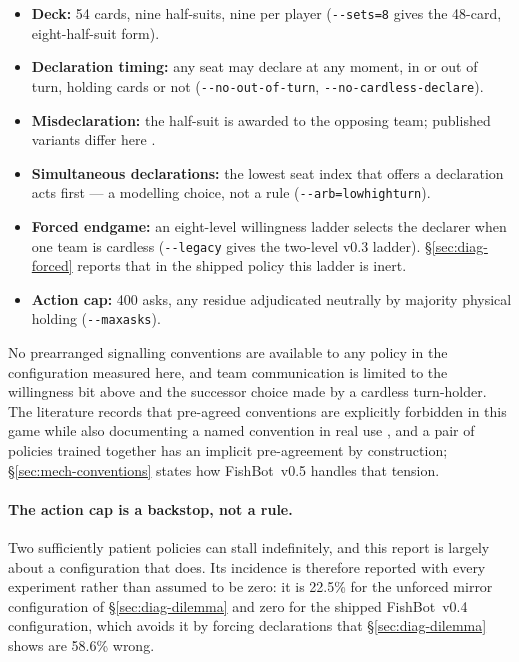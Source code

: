 \documentclass[11pt]{article}
\theoremstyle{definition}
\DeclareRobustCommand{\vfive}{\texorpdfstring{\mbox{FishBot v0.5}}{FishBot v0.5}}
\DeclareRobustCommand{\vfour}{\texorpdfstring{\mbox{FishBot v0.4}}{FishBot v0.4}}
\providecommand{\numPostHorizonWrong}{58.6}
\providecommand{\numPatientCap}{22.5}
\begin{document}
\begin{itemize}
  \item \textbf{Deck:} 54 cards, nine half-suits, nine per player
        (\texttt{-{}-sets=8} gives the 48-card, eight-half-suit form).
  \item \textbf{Declaration timing:} any seat may declare at any moment, in or
        out of turn, holding cards or not (\texttt{-{}-no-out-of-turn},
        \texttt{-{}-no-cardless-declare}).
  \item \textbf{Misdeclaration:} the half-suit is awarded to the opposing team;
        published variants differ here \cite{pagat}.
  \item \textbf{Simultaneous declarations:} the lowest seat index that offers a
        declaration acts first --- a modelling choice, not a rule
        (\texttt{-{}-arb=low\textbar high\textbar turn}).
  \item \textbf{Forced endgame:} an eight-level willingness ladder selects the
        declarer when one team is cardless (\texttt{-{}-legacy} gives the
        two-level v0.3 ladder). \S\ref{sec:diag-forced} reports that in the
        shipped policy this ladder is inert.
  \item \textbf{Action cap:} 400 asks, any residue adjudicated neutrally by
        majority physical holding (\texttt{-{}-maxasks}).
\end{itemize}

No prearranged signalling conventions are available to any policy in the
configuration measured here, and team communication is limited to the willingness
bit above and the successor choice made by a cardless turn-holder. The literature
records that pre-agreed conventions are explicitly forbidden in this game
\cite{develin} while also documenting a named convention in real use
\cite{pagat}, and a pair of policies trained together has an implicit
pre-agreement by construction; \S\ref{sec:mech-conventions} states how \vfive{}
handles that tension.

\paragraph{The action cap is a backstop, not a rule.} Two sufficiently patient
policies can stall indefinitely, and this report is largely about a configuration
that does. Its incidence is therefore reported with every experiment rather than
assumed to be zero: it is \numPatientCap\% for the unforced mirror configuration
of \S\ref{sec:diag-dilemma} and zero for the shipped \vfour{} configuration,
which avoids it by forcing declarations that \S\ref{sec:diag-dilemma} shows are
\numPostHorizonWrong\% wrong.
\end{document}
